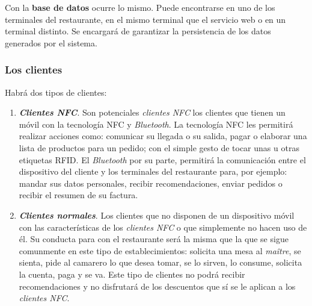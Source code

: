   Con la \textbf{base de datos} ocurre lo mismo. Puede encontrarse en uno de
  los terminales del restaurante, en el mismo terminal que el servicio web o
  en un terminal distinto. Se encargará de garantizar la persistencia de los
  datos generados por el sistema.

    \subsubsection{Los clientes}
    \label{subsubsec:clients}
  Habrá dos tipos de clientes:
  \begin{enumerate}
  \item \emph{\textbf{Clientes \acs{NFC}}}. Son potenciales \emph{clientes
  \acs{NFC}} los clientes que tienen un móvil con la tecnología \acs{NFC} y
  \emph{Bluetooth}. La tecnología \acs{NFC} les permitirá realizar acciones
  como: comunicar su llegada o su salida, pagar o elaborar una lista de
  productos para un pedido; con el simple gesto de tocar unas u otras
  etiquetas \acs{RFID}. El \emph{Bluetooth} por su parte, permitirá la
  comunicación entre el dispositivo del cliente y los terminales del
  restaurante para, por ejemplo: mandar sus datos personales, recibir
  recomendaciones, enviar pedidos o recibir el resumen de su factura.
  \item \emph{\textbf{Clientes normales}}. Los clientes que no disponen
  de un dispositivo móvil con las características de los \emph{clientes
  \acs{NFC}} o que simplemente no hacen uso de él. Su conducta para con
  el restaurante será la misma que la que se sigue comunmente en este tipo
  de establecimientos: solicita una mesa al \emph{maître}, se sienta,
  pide al camarero lo que desea tomar, se lo sirven, lo consume, solicita
  la cuenta, paga y se va. Este tipo de clientes no podrá recibir
  recomendaciones y no disfrutará de los descuentos que sí se le aplican
  a los \emph{clientes \acs{NFC}}.
  \end{enumerate}

